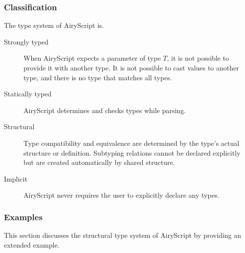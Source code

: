 \subsubsection{Classification}
\label{sec:type_classification}
The type system of AiryScript is.
\begin{description}
  \item[Strongly typed] When AiryScript expects a parameter of type $T$, it is
    not possible to provide it with another type. It is not possible to cast
    values to another type, and there is no type that matches all types.
  \item[Statically typed] AiryScript determines and checks types while parsing.
  \item[Structural] Type compatibility and equivalence are determined by the
    type’s actual structure or definition. Subtyping relations cannot be
    declared explicitly but are created automatically by shared structure.
  \item[Implicit] AiryScript never requires the user to explicitly declare any
    types.
\end{description}

\subsubsection{Examples}
\label{sec:type_examples}
This section discusses the structural type system of AiryScript by providing an
extended example.

